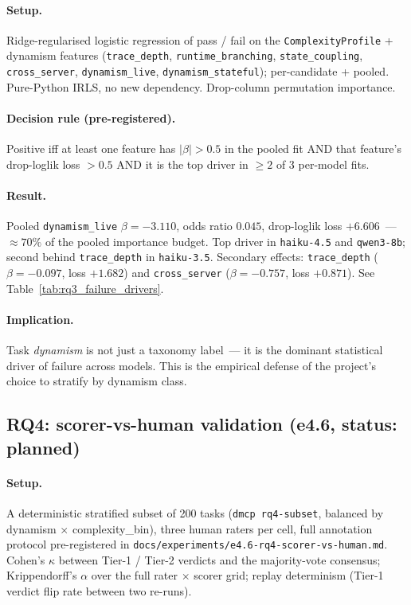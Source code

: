 \paragraph{Setup.} Ridge-regularised logistic regression of
pass / fail on the \texttt{ComplexityProfile} + dynamism features
(\texttt{trace\_depth}, \texttt{runtime\_branching},
\texttt{state\_coupling}, \texttt{cross\_server},
\texttt{dynamism\_live}, \texttt{dynamism\_stateful}); per-candidate +
pooled. Pure-Python IRLS, no new dependency. Drop-column permutation
importance.

\paragraph{Decision rule (pre-registered).} Positive iff at least one
feature has $|\beta| > 0.5$ in the pooled fit AND that feature's
drop-loglik loss $> 0.5$ AND it is the top driver in $\geq 2$ of $3$
per-model fits.

\paragraph{Result.} Pooled \texttt{dynamism\_live}
$\beta = \mathbf{-3.110}$, odds ratio $\mathbf{0.045}$, drop-loglik loss
$\mathbf{+6.606}$~--- $\approx 70\%$ of the pooled importance budget.
Top driver in \texttt{haiku-4.5} and \texttt{qwen3-8b}; second behind
\texttt{trace\_depth} in \texttt{haiku-3.5}. Secondary effects:
\texttt{trace\_depth} ($\beta = -0.097$, loss $+1.682$) and
\texttt{cross\_server} ($\beta = -0.757$, loss $+0.871$). See
Table~\ref{tab:rq3_failure_drivers}.



\paragraph{Implication.} Task \emph{dynamism} is not just a taxonomy
label~--- it is the dominant statistical driver of failure across
models. This is the empirical defense of the project's choice to
stratify by dynamism class.

\subsection{RQ4: scorer-vs-human validation (e4.6, status: planned)}
\label{sec:rq4}

\paragraph{Setup.} A deterministic stratified subset of 200 tasks
(\texttt{dmcp rq4-subset}, balanced by dynamism $\times$
complexity\_bin), three human raters per cell, full annotation protocol
pre-registered in
\texttt{docs/experiments/e4.6-rq4-scorer-vs-human.md}. Cohen's $\kappa$
between Tier-1 / Tier-2 verdicts and the majority-vote consensus;
Krippendorff's $\alpha$ over the full rater $\times$ scorer grid;
replay determinism (Tier-1 verdict flip rate between two re-runs).

